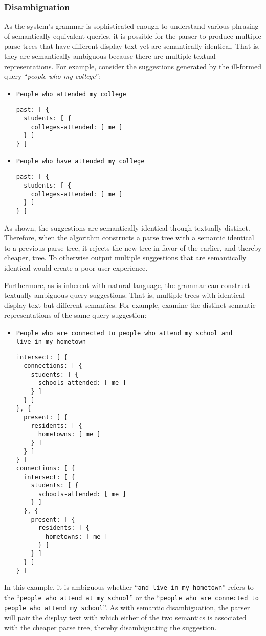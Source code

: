 \documentclass{article}
\begin{document}
\subsubsection{Disambiguation}
As the system's grammar is sophisticated enough to understand various phrasing of semantically equivalent queries, it is possible for the parser to produce multiple parse trees that have different display text yet are semantically identical. That is, they are semantically ambiguous because there are multiple textual representations. For example, consider the suggestions generated by the ill-formed query ``\textit{people who my college}'':
\begin{itemize}
\item \texttt{People who attended my college}
\begin{verbatim}
past: [ {
  students: [ {
    colleges-attended: [ me ]
  } ]
} ]
\end{verbatim}
\item \texttt{People who have attended my college}
\begin{verbatim}
past: [ {
  students: [ {
    colleges-attended: [ me ]
  } ]
} ]
\end{verbatim}
\end{itemize}
As shown, the suggestions are semantically identical though textually distinct. Therefore, when the algorithm constructs a parse tree with a semantic identical to a previous parse tree, it rejects the new tree in favor of the earlier, and thereby cheaper, tree. To otherwise output multiple suggestions that are semantically identical would create a poor user experience.

Furthermore, as is inherent with natural language, the grammar can construct textually ambiguous query suggestions. That is, multiple trees with identical display text but different semantics. For example, examine the distinct semantic representations of the same query suggestion:
\begin{itemize}
\item \texttt{People who are connected to people who attend my school and\\live in my hometown}
\begin{multicols}{2}
\begin{verbatim}
intersect: [ {
  connections: [ {
    students: [ {
      schools-attended: [ me ]
    } ]
  } ]
}, {
  present: [ {
    residents: [ {
      hometowns: [ me ]
    } ]
  } ]
} ]
connections: [ {
  intersect: [ {
    students: [ {
      schools-attended: [ me ]
    } ]
  }, {
    present: [ {
      residents: [ {
        hometowns: [ me ]
      } ]
    } ]
  } ]
} ]
\end{verbatim}
\end{multicols}
\end{itemize}
In this example, it is ambiguous whether ``\texttt{and live in my hometown}'' refers to the ``\texttt{people who attend at my school}'' or the ``\texttt{people who are connected to people who attend my school}''. As with semantic disambiguation, the parser will pair the display text with which either of the two semantics is associated with the cheaper parse tree, thereby disambiguating the suggestion.
\end{document}
